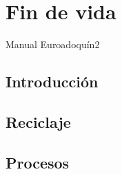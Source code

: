 \chapter{Fin de vida}
Manual Euroadoquín2
\section{Introducción}
\section{Reciclaje}
\section{Procesos}
